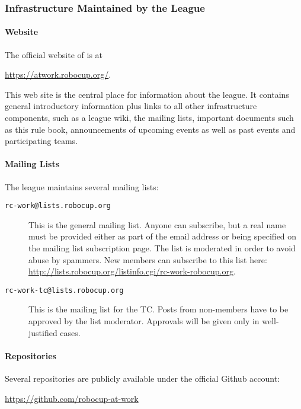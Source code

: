 \subsubsection{Infrastructure Maintained by the League} \label{ssec:LeagueInfrastructure}

\paragraph{Website}
The official website of \RCAW is at
\begin{center}
\url{https://atwork.robocup.org/}.
\end{center}

This web site is the central place for information about the league. It contains general introductory information plus links to all other infrastructure components, such as a league wiki, the mailing lists, important documents such as this rule book, announcements of upcoming events as well as past events and participating teams.

\paragraph{Mailing Lists}
The league maintains several mailing lists:
\begin{description}
	\item[\texttt{rc-work@lists.robocup.org}] This is the general \RCAW mailing list. Anyone can subscribe, but a real name must be provided either as part of the email address or being specified on the mailing list subscription page. The list is moderated in order to avoid abuse by spammers. New members can subscribe to this list here: \url{http://lists.robocup.org/listinfo.cgi/rc-work-robocup.org}.

	\item[\texttt{rc-work-tc@lists.robocup.org}] This is the mailing list for the TC. Posts from non-members have to be approved by the list moderator. Approvals will be given only in well-justified cases.
\end{description}

\paragraph{Repositories}
Several repositories are publicly available under the official \RCAW Github account:
\begin{center}
\url{https://github.com/robocup-at-work}
\end{center}

